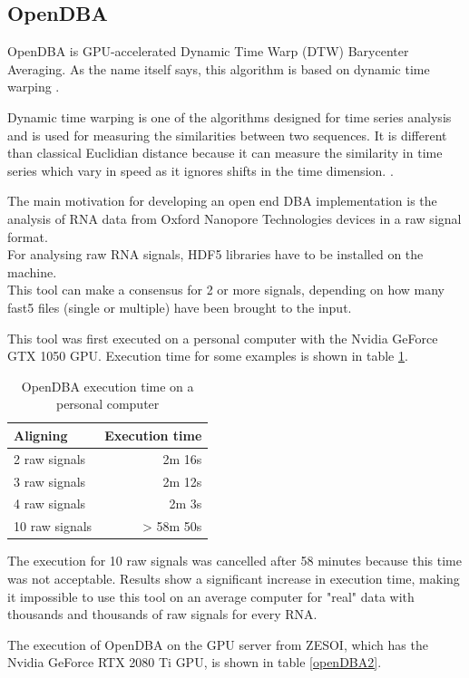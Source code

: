 \documentclass[times, utf8, zavrsni, numeric]{fer}
\begin{document}
\subsection{OpenDBA}
OpenDBA is GPU-accelerated Dynamic Time Warp (DTW) Barycenter Averaging. 
As the name itself says, this algorithm is based on dynamic time warping \cite{openDBA} \cite{dba}.

Dynamic time warping is one of the algorithms designed for time series analysis and
is used for measuring the similarities between two sequences. It is different than 
classical Euclidian distance because it can measure the similarity in time series
which vary in speed as it ignores shifts in the time dimension. \cite{dynamicTimeWarping}.

The main motivation for developing an open end DBA implementation is the analysis of RNA data from
Oxford Nanopore Technologies devices in a raw signal format. \\
For analysing raw RNA signals, HDF5 libraries have to be installed on the machine. \\
This tool can make a consensus for 2 or more signals, depending on how many fast5 files (single or multiple) 
have been brought to the input. 

This tool was first executed on a personal computer with the Nvidia GeForce GTX 1050 GPU. Execution time for
some examples is shown in table \ref{openDBA1}.

\begin{table}[H]
\caption{OpenDBA execution time on a personal computer}
\label{openDBA1} 
\centering
\begin{tabular}{lr}
    \textbf{Aligning} & \textbf{Execution time} \\ \hline
    2 raw signals & 2m 16s \\ \hline
    3 raw signals & 2m 12s \\ \hline
    4 raw signals & 2m 3s \\ \hline
    10 raw signals & > 58m 50s \\ \hline
\end{tabular}
\end{table}

The execution for 10 raw signals was cancelled after 58 minutes because this time was not acceptable.
Results show a significant increase in execution time, making it impossible to use this tool on 
an average computer for "real" data with thousands and thousands of raw signals for every RNA.

The execution of OpenDBA on the GPU server from ZESOI, which has the Nvidia GeForce RTX 2080 Ti GPU, 
is shown in table \ref{openDBA2}.
\end{document}

